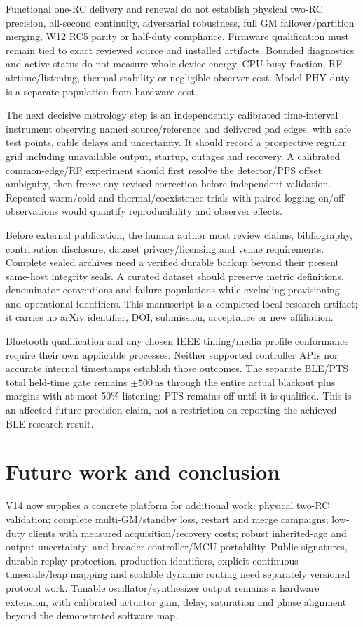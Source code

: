 \documentclass[11pt,letterpaper]{article}
\newcommand{\ns}{\,\mathrm{ns}}\newcommand{\us}{\,\mu\mathrm{s}}\newcommand{\ms}{\,\mathrm{ms}}\newcommand{\ppb}{\,\mathrm{ppb}}\newcommand{\code}[1]{\texttt{#1}}\newcolumntype{L}[1]{>{\RaggedRight\arraybackslash}p{#1}}
\begin{document}
Functional one-RC delivery and renewal do not establish physical two-RC precision, all-second continuity, adversarial robustness, full GM failover/partition merging, W12 RC5 parity or half-duty compliance. Firmware qualification must remain tied to exact reviewed source and installed artifacts. Bounded diagnostics and active status do not measure whole-device energy, CPU busy fraction, RF airtime/listening, thermal stability or negligible observer cost. Model PHY duty is a separate population from hardware cost.

The next decisive metrology step is an independently calibrated time-interval instrument observing named source/reference and delivered pad edges, with safe test points, cable delays and uncertainty. It should record a prospective regular grid including unavailable output, startup, outages and recovery. A calibrated common-edge/RF experiment should first resolve the detector/PPS offset ambiguity, then freeze any revised correction before independent validation. Repeated warm/cold and thermal/coexistence trials with paired logging-on/off observations would quantify reproducibility and observer effects.

Before external publication, the human author must review claims, bibliography, contribution disclosure, dataset privacy/licensing and venue requirements. Complete sealed archives need a verified durable backup beyond their present same-host integrity seals. A curated dataset should preserve metric definitions, denominator conventions and failure populations while excluding provisioning and operational identifiers. This manuscript is a completed local research artifact; it carries no arXiv identifier, DOI, submission, acceptance or new affiliation.

Bluetooth qualification and any chosen IEEE timing/media profile conformance require their own applicable processes. Neither supported controller APIs nor accurate internal timestamps establish those outcomes. The separate BLE/PTS total held-time gate remains $\pm500\ns$ through the entire actual blackout plus margins with at most 50\% listening; PTS remains off until it is qualified. This is an affected future precision claim, not a restriction on reporting the achieved BLE research result.

\section{Future work and conclusion}
V14 now supplies a concrete platform for additional work: physical two-RC validation; complete multi-GM/standby loss, restart and merge campaigns; low-duty clients with measured acquisition/recovery costs; robust inherited-age and output uncertainty; and broader controller/MCU portability. Public signatures, durable replay protection, production identifiers, explicit continuous-timescale/leap mapping and scalable dynamic routing need separately versioned protocol work. Tunable oscillator/synthesizer output remains a hardware extension, with calibrated actuator gain, delay, saturation and phase alignment beyond the demonstrated software map.
\end{document}

